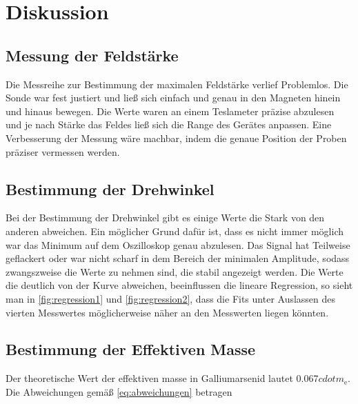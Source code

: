 \section{Diskussion}
\label{sec:Diskussion}

\subsection{Messung der Feldstärke}
Die Messreihe zur Bestimmung der maximalen Feldstärke verlief Problemlos. Die Sonde war fest 
justiert und ließ sich einfach und genau in den Magneten hinein und hinaus bewegen. Die Werte waren 
an einem Teslameter präzise abzulesen und je nach Stärke das Feldes ließ sich die Range des 
Gerätes anpassen. Eine Verbesserung der Messung wäre machbar, indem die genaue Position der Proben präziser vermessen werden.

\subsection{Bestimmung der Drehwinkel}
Bei der Bestimmung der Drehwinkel gibt es einige Werte die Stark von den anderen abweichen. Ein möglicher 
Grund dafür ist, dass es nicht immer möglich war das Minimum auf dem Oszilloskop genau abzulesen. Das Signal 
hat Teilweise geflackert oder war nicht scharf in dem Bereich der minimalen Amplitude, sodass zwangszweise die Werte 
zu nehmen sind, die stabil angezeigt werden. Die Werte die deutlich von der Kurve abweichen, beeinflussen die lineare Regression,
so sieht man in \autoref{fig:regression1} und \autoref{fig:regression2}, dass die Fits unter Auslassen des vierten Messwertes möglicherweise näher an den Messwerten
liegen könnten.

\subsection{Bestimmung der Effektiven Masse}
Der theoretische Wert der effektiven masse in Galliumarsenid lautet 0.067$cdot m_\text{e}$. Die Abweichungen gemäß \autoref{eq:abweichungen} betragen

